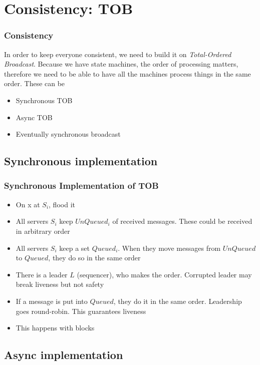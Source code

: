 \documentclass[14pt]{beamer}
\begin{document}
\section{Consistency: TOB}
    \begin{frame}
        \frametitle{Consistency}
            In order to keep everyone consistent, we need to build it on \textit{Total-Ordered Broadcast}. Because we have state machines, the order of processing matters, therefore we need to be able to have all the machines process things in the same order.
            These can be 
            \begin{itemize}
                \item Synchronous TOB
                \item Async TOB
                \item Eventually synchronous broadcast
            \end{itemize}
    \end{frame}
    \subsection{Synchronous implementation}
        \begin{frame}
            \frametitle{Synchronous Implementation of TOB}
                \begin{itemize}
                    \item On x at $S_i$, flood it 
                    \item All servers $S_i$ keep $UnQueued_i$ of received messages. These could be received in arbitrary order
                    \item All servers $S_i$ keep a set $Queued_i$. When they move messages from $UnQueued$ to $Queued$, they do so in the same order
                    \item There is a leader $L$ (sequencer), who makes the order. Corrupted leader may break liveness but not safety
                    \item If a message is put into $Queued$, they do it in the same order. Leadership goes round-robin. This guarantees liveness
                    \item This happens with blocks
                \end{itemize}
        \end{frame}

    \subsection{Async implementation}
\end{document}
